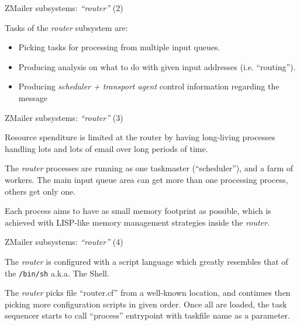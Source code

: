 \documentclass[a4paper,landscape]{slides}
\newcommand{\ZM}{ZMailer}
\begin{document}
\begin{slide}
\centerline{\large \ZM{} subsystems: {\em ``router''} (2)}

Tasks of the {\em router} subsystem are:
\begin{itemize}
\item
Picking tasks for processing from multiple input queues.

\item
Producing analysis on what to do with given input addresses
(i.e. ``routing'').

\item
Producing {\em scheduler + transport agent} control information
regarding the message
\end{itemize}

\vfill
\end{slide}

\begin{slide}
\centerline{\large \ZM{} subsystems: {\em ``router''} (3)}

Resource spenditure is limited at the router by having
long-living processes handling lots and lots of email
over long periods of time.

The {\em router} processes are running as one taskmaster
(``scheduler''), and a farm of workers.   The main input queue
area can get more than one processing process, others get
only one.

Each process aims to have as small memory footprint as possible,
which is achieved with LISP-like memory management strategies
inside the {\em router.}

\vfill
\end{slide}

\begin{slide}
\centerline{\large \ZM{} subsystems: {\em ``router''} (4)}

The {\em router} is configured with a script language which
greatly resembles that of the \verb!/bin/sh! a.k.a. The Shell.

The {\em router} picks file ``router.cf''  from a well-known
location, and continues then picking more configuration scripts
in given order.  Once all are loaded, the task sequencer starts
to call ``process'' entrypoint with taskfile name as a parameter.


\vfill
\end{slide}
\end{document}
